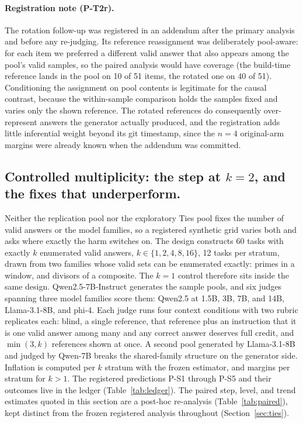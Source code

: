 \documentclass[11pt]{article}
\begin{document}
\paragraph{Registration note (P-T2r).}
The rotation follow-up was registered in an addendum after the primary analysis and before any re-judging.
Its reference reassignment was deliberately pool-aware: for each item we preferred a different valid answer that also appears among the pool's valid samples, so the paired analysis would have coverage (the build-time reference lands in the pool on 10 of 51 items, the rotated one on 40 of 51).
Conditioning the assignment on pool contents is legitimate for the causal contrast, because the within-sample comparison holds the samples fixed and varies only the shown reference.
The rotated references do consequently over-represent answers the generator actually produced, and the registration adds little inferential weight beyond its git timestamp, since the $n{=}4$ original-arm margins were already known when the addendum was committed.

\FloatBarrier
\subsection{Controlled multiplicity: the step at \texorpdfstring{$k{=}2$}{k=2}, and the fixes that underperform.}
\label{sec:synthk}

Neither the replication pool nor the exploratory Ties pool fixes the number of valid answers or the model families, so a registered synthetic grid varies both and asks where exactly the harm switches on.
The design constructs 60 tasks with exactly $k$ enumerated valid answers, $k \in \{1, 2, 4, 8, 16\}$, 12 tasks per stratum, drawn from two families whose valid sets can be enumerated exactly: primes in a window, and divisors of a composite.
The $k{=}1$ control therefore sits inside the same design.
Qwen2.5-7B-Instruct generates the sample pools, and six judges spanning three model families score them: Qwen2.5 at 1.5B, 3B, 7B, and 14B, Llama-3.1-8B, and phi-4.
Each judge runs four context conditions with two rubric replicates each: blind, a single reference, that reference plus an instruction that it is one valid answer among many and any correct answer deserves full credit, and $\min(3, k)$ references shown at once.
A second pool generated by Llama-3.1-8B and judged by Qwen-7B breaks the shared-family structure on the generator side.
Inflation is computed per $k$ stratum with the frozen estimator, and margins per stratum for $k > 1$.
The registered predictions P-S1 through P-S5 and their outcomes live in the ledger (Table~\ref{tab:ledger}).
The paired step, level, and trend estimates quoted in this section are a post-hoc re-analysis (Table~\ref{tab:paired}), kept distinct from the frozen registered analysis throughout (Section~\ref{sec:ties}).
\end{document}
